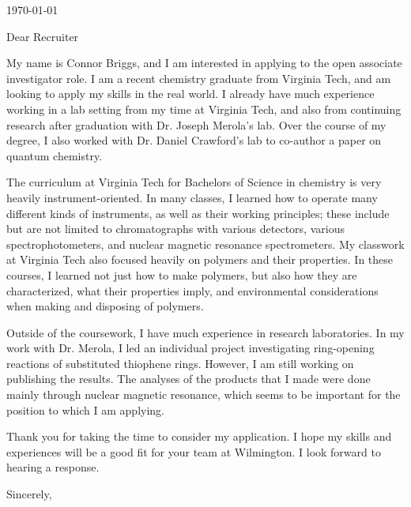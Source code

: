 \documentclass[12pt]{letter}
\begin{document}
\begin{letter}{\today}

  \opening{Dear Recruiter}

   My name is Connor Briggs, and I am interested in applying to the open associate investigator role. I am a recent chemistry graduate from Virginia Tech, and am looking to apply my skills in the real world. I already have much experience working in a lab setting from my time at Virginia Tech, and also from continuing research after graduation with Dr. Joseph Merola's lab. Over the course of my degree, I also worked with Dr. Daniel Crawford's lab to co-author a paper on quantum chemistry.
  
  
   The curriculum at Virginia Tech for Bachelors of Science in chemistry is very heavily instrument-oriented. In many classes, I learned how to operate many different kinds of instruments, as well as their working principles; these include but are not limited to chromatographs with various detectors, various spectrophotometers, and nuclear magnetic resonance spectrometers. My classwork at Virginia Tech also focused heavily on polymers and their properties. In these courses, I learned not just how to make polymers, but also how they are characterized, what their properties imply, and environmental considerations when making and disposing of polymers.

   Outside of the coursework, I have much experience in research laboratories. In my work with Dr. Merola, I led an individual project investigating ring-opening reactions of substituted thiophene rings. However, I am still working on publishing the results. The analyses of the products that I made were done mainly through nuclear magnetic resonance, which seems to be important for the position to which I am applying.


  Thank you for taking the time to consider my application. I hope my skills and experiences will be a good fit for your team at Wilmington. I look forward to hearing a response.
\closing{Sincerely,}
  
\end{letter}
\end{document}
